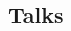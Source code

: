 \documentclass[10pt]{article} %
\begin{document}
\begin{paracol}{1}

	
	

	
	
	
	
	
	
	
	
	

\medskip %



\section{Talks}





\begin{supertabular}{rp{15cm}} %


\end{supertabular}
\end{paracol}
\end{document}
